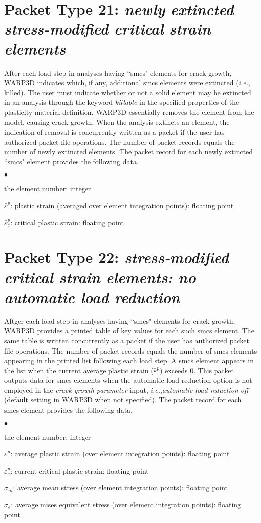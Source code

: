 \documentclass[10pt]{report}
\numberwithin{equation}{section}
\newcommand{\ie}{\ti{i.e.},\xspace}
\newcommand{\ti}{\emph}
\newcommand{\squishlist}{
 \begin{list}{$\bullet$}
  { \setlength{\itemsep}{0pt}
     \setlength{\parsep}{3pt}
     \setlength{\topsep}{3pt}
     \setlength{\partopsep}{0pt}
     \setlength{\leftmargin}{1.5em}
     \setlength{\labelwidth}{1em}
     \setlength{\labelsep}{0.5em} } }
\newcommand{\squishend}{
  \end{list}  }
\begin{document}
\section{Packet Type 21: \ti{newly extincted stress-modified critical strain elements}}
After each load step in analyses having ``smcs" elements 
for crack growth, WARP3D indicates which, if any, additional smcs elements 
were extincted (\ie killed). The user must indicate whether or not
a solid element may be extincted in an analysis through the keyword
\ti{killable} in the specified
properties of the plasticity material definition.
WARP3D essentially removes the element from the model, 
causing crack growth. When the analysis extincts an element, the indication of 
removal is concurrently written as a packet if the user has authorized packet 
file operations. The number of packet records equals the number 
of newly extincted elements.
The packet record
 for each newly extincted ``smcs" element provides the following data.
\squishlist
\item the element number:  integer
\item $\bar \varepsilon^p$:  plastic strain (averaged over element 
integration points):  floating point
\item $\bar \varepsilon^p_c$: critical plastic strain:  floating point
\squishend

%
%
\section{Packet Type 22: \ti{stress-modified critical strain elements: 
no automatic load reduction}}
Aftger each load step in analyses having ``smcs" elements for crack growth, 
WARP3D provides a printed table of key values for each such smcs element. The 
same table is written concurrently as a packet if the user has authorized 
packet file operations. The number of packet records equals the number 
of smcs elements appearing in the printed list following each load step. A 
smcs element appears in the list when the current average plastic strain 
($\bar \varepsilon^p$) exceeds 0. This packet outputs data for smcs elements 
when the automatic
load reduction option is not employed in the \ti{crack growth 
parameter }input, \ie \ti{automatic load reduction off }(default setting 
in WARP3D when not specified). The packet record for each smcs element 
provides the following data.
\squishlist
\item the element number:  integer
\item $\bar \varepsilon^p$:  average plastic strain (over element 
integration points):  floating point
\item $\bar \varepsilon^p_c$:  current critical plastic strain: 
 floating point
\item $\sigma_m$:  average mean stress (over element 
integration points):  floating point
\item $\sigma_e$: average mises equivalent stress (over 
element integration points):  floating point
\squishend
\end{document}
